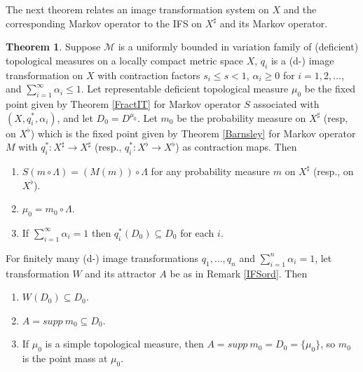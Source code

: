 \documentclass[sn-mathphys-num]{sn-jnl}%
\theoremstyle{thmstyleone}%
\theoremstyle{definition}
\newtheorem{theorem}{Theorem}%
\begin{document}
The next theorem relates an image transformation system on $X$  and the corresponding  Markov operator  
to the IFS on $X^{\sharp}$ and its Markov operator. 

\begin{theorem} \label{IFSonXandX*}
Suppose  $\mathcal{M}$ is a uniformly bounded in variation family of (deficient) topological measures on a locally compact metric space $X$, 
 $q_i$  
is a (d-) image transformation on $X$ with contraction factors $s_i \le s <1$, 
$ \alpha_i \ge 0$ for $i=1, 2, \ldots$, 
and $ \sum_{i=1}^{\infty} \alpha_i \le 1$. 
Let representable deficient topological measure $\mu_0$ be the fixed point given by Theorem \ref{FractIT} for Markov operator
$S$ associated with $ (X,  q_i^*, \alpha_i)$,  and let $D_0 = D^{\mu_0}$.
Let $m_0$ be the probability measure on $X^{\sharp}$ (resp, on $X^\flat$) which is the fixed point given by Theorem \ref{Barnsley} 
for Markov operator $M$ with $q_i^*:X^{\sharp} \rightarrow X^{\sharp}$ (resp., $q_i^*:X^{\flat} \rightarrow X^{\flat}$) as contraction maps.
Then
\begin{enumerate}[label=(\arabic*),ref=(\arabic*)]
\item
$S(m \circ \Lambda) = (M(m)) \circ \Lambda$ for any probability measure $m$ on $X^{\sharp}$ (resp., on $X^\flat$).
\item
$\mu_0 = m_0 \circ \Lambda$.
\item \label{qido}
If   $ \sum_{i=1}^\infty \alpha_i = 1$ then $q_i^*(D_0) \subseteq D_0$ for each $i$.
\end{enumerate}
For finitely many (d-) image transformations $q_1, \ldots, q_n$ and $ \sum_{i=1}^n \alpha_i = 1$,
 let transformation $W$ and its attractor $A$ be as in Remark \ref{IFSord}.  Then
\begin{enumerate}[label=(\roman*),ref=(\roman*)]
\item \label{wdodo}
$W(D_0) \subseteq D_0$.
\item
$A = supp \  m_0   \subseteq D_0$.
\item 
If $\mu_0$ is a simple topological measure, then $A = supp \  m_0 = D_0 =  \{ \mu_0\}$, so $m_0$ is the point mass at $ \mu_0$.
\end{enumerate}
\end{theorem}
\end{document}

